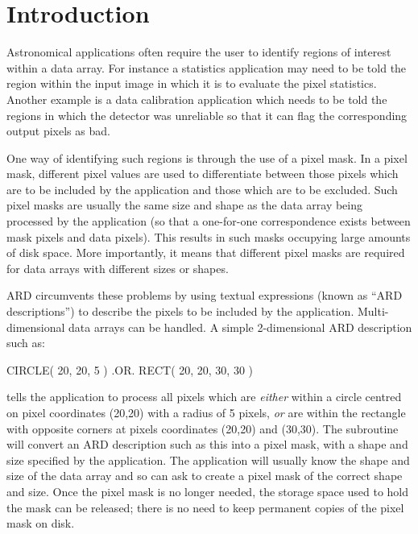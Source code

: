 \documentclass[11pt]{starlink}
\begin{document}
\scfrontmatter

\section{Introduction}

Astronomical applications often require the user to identify regions of interest
within a data array. For instance a statistics application may need to be told
the region within the input image in which it is to evaluate the pixel
statistics. Another example is a data calibration application which needs
to be told the regions in which the detector was unreliable so that it can flag
the corresponding output pixels as bad.

One way of identifying such regions is through the use of a pixel mask. In a
pixel mask, different pixel values are used to differentiate between those
pixels which are to be included by the application and those which are to be
excluded. Such pixel masks are usually the same size and shape as the data array
being processed by the application (so that a one-for-one correspondence exists
between mask pixels and data pixels). This results in such masks occupying large
amounts of disk space. More importantly, it means that different pixel masks are
required for data arrays with different sizes or shapes.

ARD circumvents these problems by using textual expressions (known as ``ARD
descriptions'') to describe the pixels to be included by the application.
Multi-dimensional data arrays can be handled. A simple 2-dimensional ARD
description such as:

\small
\begin{terminalv}
      CIRCLE( 20, 20, 5 ) .OR. RECT( 20, 20, 30, 30 )
\end{terminalv}
\normalsize

tells the application to process all pixels which are \emph{either} within a
circle centred on pixel coordinates (20,20) with a radius of 5 pixels,
\emph{or} are within the rectangle with opposite corners at pixels coordinates
(20,20) and (30,30). The 
subroutine will convert an ARD description such as this into a pixel mask, with
a shape and size specified by the application. The application will usually know
the shape and size of the data array and so can ask  to create a pixel
mask of the correct shape and size. Once the pixel mask is no longer needed,
the storage space used to hold the mask can be released; there is no need to
keep permanent copies of the pixel mask on disk.
\end{document}
